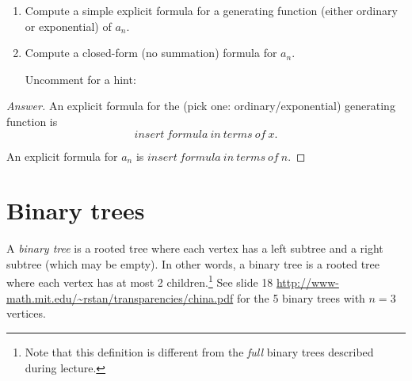 \documentclass[12pt]{amsart}
\begin{document}
\begin{enumerate}
\item 
Compute a simple explicit formula for a generating function (either ordinary or exponential) of $a_n$.
\item 
Compute a closed-form (no summation) formula for $a_n$.

{\tiny \noindent Uncomment for a hint:}

\end{enumerate}

\begin{proof}[Answer]
An explicit formula for the (pick one: ordinary/exponential) generating function is \[\boxed{insert ~ formula ~ in ~ terms ~ of ~ x}.\]

An explicit formula for $a_n$ is $\boxed{insert ~ formula ~ in ~ terms ~ of ~ n}$.
\end{proof}




\section{
Binary trees
}
 
A \emph{binary tree} is a rooted tree where each vertex has a left subtree and a right subtree (which may be empty). In other words, a binary tree is a rooted tree where each vertex has at most 2 children.\footnote{Note that this definition is different from the \emph{full} binary trees described during lecture.} 
See slide 18 \url{http://www-math.mit.edu/~rstan/transparencies/china.pdf} for the 5 binary trees with $n=3$ vertices. %
\end{document}

